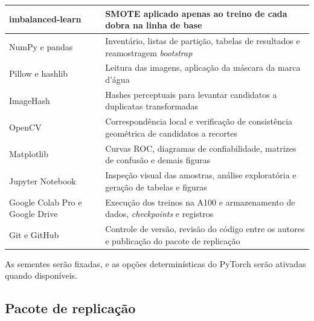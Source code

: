 \begin{longtable}{|>{\raggedright\arraybackslash}p{4.2cm}|>{\raggedright\arraybackslash}p{10.4cm}|}
	imbalanced-learn                     & SMOTE aplicado apenas ao treino de cada dobra na linha de base                                                                               \\ \hline
	NumPy e pandas                       & Inventário, listas de partição, tabelas de resultados e reamostragem \textit{bootstrap}                                                      \\ \hline
	Pillow e hashlib                     & Leitura das imagens, aplicação da máscara da marca d'água                                                                                    \\ \hline
	ImageHash                            & Hashes perceptuais para levantar candidatos a duplicatas transformadas                                                                       \\ \hline
	OpenCV                               & Correspondência local e verificação de consistência geométrica de candidatos a recortes                                                      \\ \hline
	Matplotlib                           & Curvas ROC, diagramas de confiabilidade, matrizes de confusão e demais figuras                                                               \\ \hline
	Jupyter Notebook                     & Inspeção visual das amostras, análise exploratória e geração de tabelas e figuras                                                            \\ \hline
	Google Colab Pro e Google Drive      & Execução dos treinos na A100 e armazenamento de dados, \textit{checkpoints} e registros                                                      \\ \hline
	Git e GitHub                         & Controle de versão, revisão do código entre os autores e publicação do pacote de replicação                                                  \\ \hline
\end{longtable}
\endgroup
{}

As sementes serão fixadas, e as opções determinísticas do PyTorch serão
ativadas quando disponíveis.

\subsection{Pacote de replicação}
\label{subsec:pacote-replicacao}


